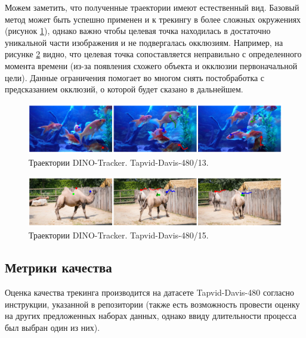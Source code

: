 \documentclass[a4paper, 14pt]{extarticle}
\theoremstyle{definition}
\theoremstyle{plain}
\theoremstyle{remark}
\begin{document}
Можем заметить, что полученные траектории имеют естественный вид. 
Базовый метод может быть успешно применен и к трекингу в более сложных окружениях 
(рисунок \ref{fig:davis-13}), однако важно чтобы целевая точка находилась в достаточно 
уникальной части изображения и не подвергалась окклюзиям. Например, на рисунке 
\ref{fig:davis-15} видно, что целевая точка сопоставляется неправильно с определенного 
момента времени (из-за появления схожего объекта и окклюзии первоначальной цели). 
Данные ограничения помогает во многом снять постобработка с предсказанием окклюзий, 
о которой будет сказано в дальнейшем.

\begin{figure}
    [H]
    \centering
    \includegraphics[width=\textwidth]{figs/davis-13.png}
    \caption{Траектории DINO-Tracker. Tapvid-Davis-480/13.}
    \label{fig:davis-13}
\end{figure}
\begin{figure}
    [H]
    \centering
    \includegraphics[width=\textwidth]{figs/davis-15.png}
    \caption{Траектории DINO-Tracker. Tapvid-Davis-480/15.}
    \label{fig:davis-15}
\end{figure}

\subsection{Метрики качества}

Оценка качества трекинга производится на датасете Tapvid-Davis-480 согласно инструкции, указанной в репозитории (также есть возможность провести оценку на других предложенных наборах данных, однако ввиду длительности процесса был выбран один из них).
\end{document}
